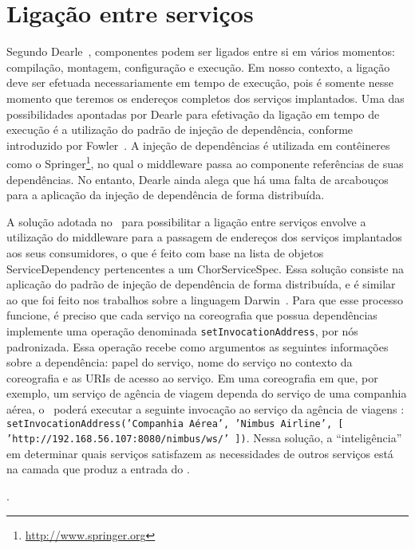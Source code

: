 \section{Ligação entre serviços}
\label{sec:ligacao}

Segundo Dearle~\cite{Dearle2007PastPresentFuture}, componentes podem ser ligados entre si em vários momentos: compilação, montagem, configuração e execução. Em nosso contexto, a ligação deve ser efetuada necessariamente em tempo de execução, pois é somente nesse momento que teremos os endereços completos dos serviços implantados. Uma das possibilidades apontadas por Dearle para efetivação da ligação em tempo de execução é a utilização do padrão de injeção de dependência, conforme introduzido por Fowler~\cite{Fowler2004Inversion}. A injeção de dependências é utilizada em contêineres como o Springer\footnote{\url{http://www.springer.org}}, no qual o middleware passa ao componente referências de suas dependências. No entanto, Dearle ainda alega que há uma falta de arcabouços para a aplicação da injeção de dependência de forma distribuída.

A solução adotada no \ee\ para possibilitar a ligação entre serviços envolve a utilização do middleware para a passagem de endereços dos serviços implantados aos seus consumidores, o que é feito com base na lista de objetos \textsf{ServiceDependency} pertencentes a um \textsf{ChorServiceSpec}. Essa solução consiste na aplicação do padrão de injeção de dependência de forma distribuída, e é similar ao que foi feito nos trabalhos sobre a linguagem Darwin~\cite{Magee1996Dynamic, Magee1994Regis}. Para que esse processo funcione, é preciso que cada serviço na coreografia que possua dependências implemente uma operação denominada \texttt{setInvocationAddress}, por nós padronizada. Essa operação recebe como argumentos as seguintes informações sobre a dependência: papel do serviço, nome do serviço no contexto da coreografia e as URIs de acesso ao serviço.  Em uma coreografia em que, por exemplo, um serviço de agência de viagem dependa do serviço de uma companhia aérea, o \ee\ poderá executar a seguinte invocação ao serviço da agência de viagens : \texttt{setInvocationAddress('Companhia Aérea', 'Nimbus Airline', [ 'http://192.168.56.107:8080/nimbus/ws/' ])}. Nessa solução, a ``inteligência'' em determinar quais serviços satisfazem as necessidades de outros serviços está na camada que produz a entrada do \ee.

.

